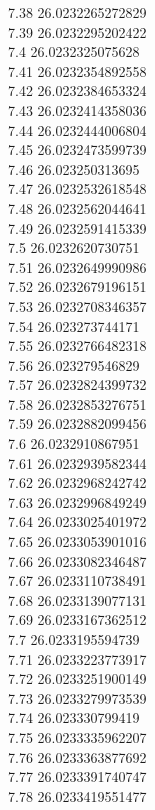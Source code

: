 {7.38	26.0232265272829\\
7.39	26.0232295202422\\
7.4	26.0232325075628\\
7.41	26.0232354892558\\
7.42	26.0232384653324\\
7.43	26.0232414358036\\
7.44	26.0232444006804\\
7.45	26.0232473599739\\
7.46	26.023250313695\\
7.47	26.0232532618548\\
7.48	26.0232562044641\\
7.49	26.0232591415339\\
7.5	26.0232620730751\\
7.51	26.0232649990986\\
7.52	26.0232679196151\\
7.53	26.0232708346357\\
7.54	26.023273744171\\
7.55	26.0232766482318\\
7.56	26.023279546829\\
7.57	26.0232824399732\\
7.58	26.0232853276751\\
7.59	26.0232882099456\\
7.6	26.0232910867951\\
7.61	26.0232939582344\\
7.62	26.0232968242742\\
7.63	26.0232996849249\\
7.64	26.0233025401972\\
7.65	26.0233053901016\\
7.66	26.0233082346487\\
7.67	26.0233110738491\\
7.68	26.0233139077131\\
7.69	26.0233167362512\\
7.7	26.0233195594739\\
7.71	26.0233223773917\\
7.72	26.0233251900149\\
7.73	26.0233279973539\\
7.74	26.023330799419\\
7.75	26.0233335962207\\
7.76	26.0233363877692\\
7.77	26.0233391740747\\
7.78	26.0233419551477\\
}
